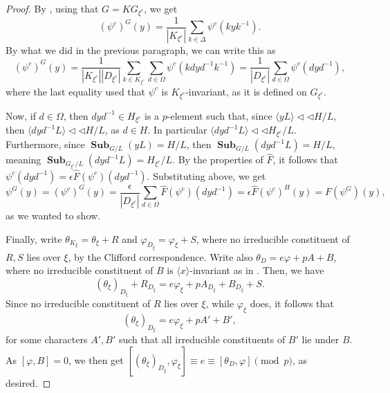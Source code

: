 \documentclass[12pt]{amsart}
\DeclareMathOperator{\Sub}{\mathbf{Sub}}
\theoremstyle{remark}
\theoremstyle{definition}
\theoremstyle{plain}
\theoremstyle{definition}
\numberwithin{equation}{section}
\begin{document}
\begin{proof}
	By \cite[Lemma 3.3]{PickyPSolvable}, using that $G = KG_{\xi^c}$, we get
	\begin{equation*}
		(\psi^c)^G(y) = \frac{1}{|K_{\xi^c}|}\sum_{k \in \Delta} \psi^c(kyk^{-1}).
	\end{equation*}
	By what we did in the previous paragraph, we can write this as
	\begin{equation*}
		(\psi^c)^G(y) = \frac{1}{|K_{\xi^c}||D_{\xi^c}|}\sum_{k \in K_{\xi^c}} \sum_{d \in \Omega} \psi^c(kdyd^{-1}k^{-1}) = \frac{1}{|D_{\xi^c}|}\sum_{d \in \Omega} \psi^c(dyd^{-1}),
	\end{equation*}
	where the last equality used that $\psi^c$ is $K_{\xi^c}$-invariant, as it is defined on $G_{\xi^c}$. 
	
	Now, if $d \in \Omega$, then $dyd^{-1} \in H_{\xi^c}$ is a $p$-element such that, since $\langle yL \rangle {\triangleleft}{\triangleleft} H/L$, then $\langle dyd^{-1}L \rangle {\triangleleft}{\triangleleft} H/L$, as $d \in H$. In particular $\langle dyd^{-1}L \rangle {\triangleleft}{\triangleleft} H_{\xi^c}/L$. Furthermore, since $\Sub_{G/L}(yL) = H/L$, then $\Sub_{G/L}(dyd^{-1}L) = H/L$, meaning $\Sub_{G_{\xi^c}/L}(dyd^{-1}L) = H_{\xi^c}/L$. By the properties of $\hat{F}$, it follows that $\psi^c(dyd^{-1}) = \epsilon \hat{F}(\psi^c)(dyd^{-1})$. Substituting above, we get
	\begin{equation*}
		\psi^G(y) = (\psi^c)^G(y) = \frac{\epsilon}{|D_{\xi^c}|}\sum_{d \in \Omega} \hat{F}(\psi^c)(dyd^{-1}) = \epsilon \hat{F}(\psi^c)^H(y) = F(\psi^G)(y),
	\end{equation*}
	as we wanted to show.
	
	Finally, write $\theta_{K_\xi} = \theta_\xi + R$ and $\varphi_{D_\xi} = \varphi_\xi + S$, where no irreducible constituent of $R, S$ lies over $\xi$, by the Clifford correspondence. Write also $\theta_D = e\varphi + pA + B$, where no irreducible constituent of $B$ is $\langle x \rangle$-invariant as in . Then, we have
	\begin{equation*}
		(\theta_\xi)_{D_\xi} + R_{D_\xi} = e\varphi_\xi + pA_{D_\xi} + B_{D_\xi} + S.
	\end{equation*}
	Since no irreducible constituent of $R$ lies over $\xi$, while $\varphi_\xi$ does, it follows that
	\begin{equation*}
		(\theta_\xi)_{D_\xi} = e\varphi_\xi + pA' + B',
	\end{equation*}
	for some characters $A', B'$ such that all irreducible constituents of $B'$ lie under $B$. As $[\varphi, B] = 0$, we then get $[(\theta_\xi)_{D_\xi}, \varphi_\xi] \equiv e \equiv [\theta_D, \varphi] \pmod{p}$, as desired.
\end{proof}
\end{document}
